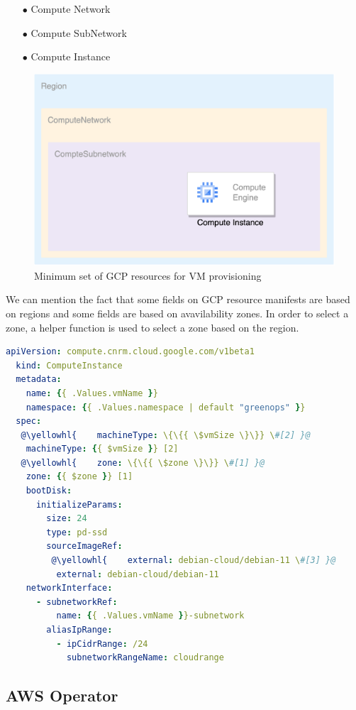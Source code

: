 \begin{itemize}[itemsep=0.2pt, topsep=1pt] 
  \item[$\bullet$] Compute Network
  \item[$\bullet$] Compute SubNetwork
  \item[$\bullet$] Compute Instance
  \end{itemize}

\begin{figure}[H]
\centering
\includegraphics[width=0.75\linewidth]{images/gcp.png}
\caption{Minimum set of GCP resources for VM provisioning}
\label{fig:gcp}
\end{figure}

We can mention the fact that some fields on GCP resource manifests are based on regions and some fields are based on avavilability zones.
In order to select a zone, a helper function is used to select a zone based on the region.

\begin{lstlisting}[language=yaml, caption={GCP Intance Custom Resource}, label={lst:gcp}]
  apiVersion: compute.cnrm.cloud.google.com/v1beta1
  kind: ComputeInstance
  metadata:
    name: {{ .Values.vmName }}
    namespace: {{ .Values.namespace | default "greenops" }}
  spec:
   @\yellowhl{    machineType: \{\{{ \$vmSize \}\}} \#[2] }@
    machineType: {{ $vmSize }} [2]
   @\yellowhl{    zone: \{\{{ \$zone \}\}} \#[1] }@
    zone: {{ $zone }} [1]
    bootDisk:
      initializeParams:
        size: 24
        type: pd-ssd
        sourceImageRef:
         @\yellowhl{    external: debian-cloud/debian-11 \#[3] }@
          external: debian-cloud/debian-11
    networkInterface:
      - subnetworkRef:
          name: {{ .Values.vmName }}-subnetwork
        aliasIpRange:
          - ipCidrRange: /24
            subnetworkRangeName: cloudrange
\end{lstlisting}

\subsection{AWS Operator}

